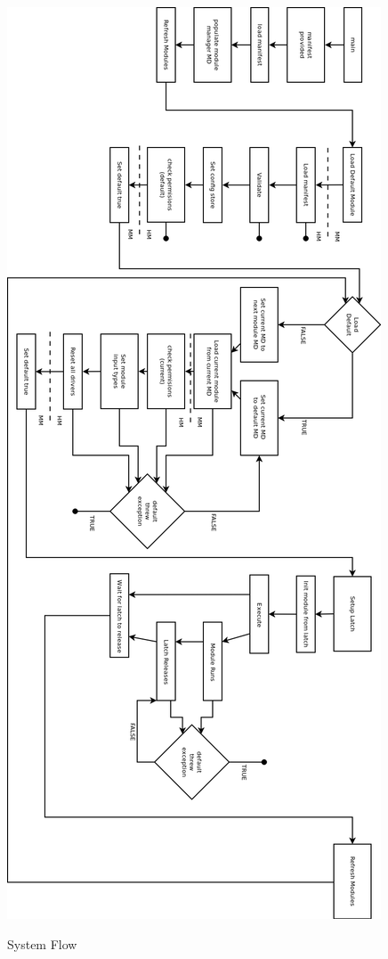 \documentclass[11pt,letterpaper]{article}
\begin{document}
	\begin{figure}[h!]
		\caption{System Flow}
		\centering
		\includegraphics[height=0.9\textheight]{flow_diagram}
		\label{fig:system_flow}
	\end{figure}
\end{document}
